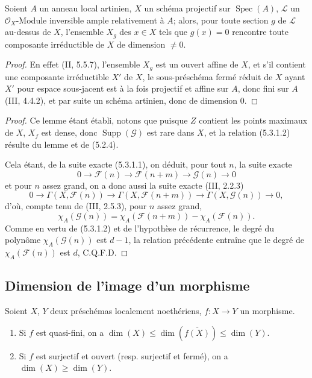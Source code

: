 \begin{lemma}[5.3.1.3]
\label{IV.2.s5.3.1.3-fr}
Soient $A$ un anneau local artinien, $X$ un schéma projectif sur
$\operatorname{Spec}(A)$, $\mathcal L$ un $\mathcal O_X$-Module inversible
ample relativement à $A$; alors, pour toute section $g$ de $\mathcal L$
au-dessus de $X$, l'ensemble $X_g$ des $x\in X$ tels que $g(x)=0$ rencontre
toute composante irréductible de $X$ de dimension $\ne0$.
\end{lemma}

\begin{proof}
En effet (II, 5.5.7), l'ensemble $X_g$ est un ouvert affine de $X$, et s'il
contient une composante irréductible $X'$ de $X$, le sous-préschéma fermé
réduit de $X$ ayant $X'$ pour espace sous-jacent est à la fois projectif et
affine sur $A$, donc fini sur $A$ (III, 4.4.2), et par suite un schéma
artinien, donc de dimension $0$.
\end{proof}

\begin{proof}
Ce lemme étant établi, notons que puisque $Z$ contient les points maximaux de
$X$, $X_f$ est dense, donc $\operatorname{Supp}(\mathcal G)$ est rare dans
$X$, et la relation (5.3.1.2) résulte du lemme et de (5.2.4).


Cela étant, de la suite exacte (5.3.1.1), on déduit, pour tout $n$, la suite
exacte
\[
0\longrightarrow\mathcal F(n)\longrightarrow\mathcal F(n+m)
\longrightarrow\mathcal G(n)\longrightarrow0
\]
et pour $n$ assez grand, on a donc aussi la suite exacte (III, 2.2.3)
\[
0\longrightarrow\Gamma(X,\mathcal F(n))
\longrightarrow\Gamma(X,\mathcal F(n+m))
\longrightarrow\Gamma(X,\mathcal G(n))\longrightarrow0,
\]
d'où, compte tenu de (III, 2.5.3), pour $n$ assez grand,
\[
\chi_A(\mathcal G(n))
=\chi_A(\mathcal F(n+m))-\chi_A(\mathcal F(n)).
\]
Comme en vertu de (5.3.1.2) et de l'hypothèse de récurrence, le degré du
polynôme $\chi_A(\mathcal G(n))$ est $d-1$, la relation précédente entraîne
que le degré de $\chi_A(\mathcal F(n))$ est $d$, C.Q.F.D.
\end{proof}

\subsection{Dimension de l'image d'un morphisme}
\label{IV.2.s5.4-fr}

\begin{proposition}[5.4.1]
\label{IV.2.s5.4.1-fr}
Soient $X$, $Y$ deux préschémas localement noethériens, $f:X\to Y$ un
morphisme.
\begin{enumerate}
\item[(i)] Si $f$ est quasi-fini, on a
$\dim(X)\leq\dim(\overline{f(X)})\leq\dim(Y)$.
\item[(ii)] Si $f$ est surjectif et ouvert (resp. surjectif et fermé), on a
$\dim(X)\geq\dim(Y)$.
\end{enumerate}
\end{proposition}

